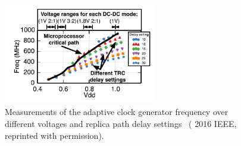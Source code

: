 \documentclass[graybox]{svmult}
\begin{document}

\begin{figure}
  \centering
  \includegraphics[width=0.6\textwidth]{6-raven3-clock}
  \caption{Measurements of the adaptive clock generator frequency over different voltages and replica path delay settings~\cite{Zimmer2016} ({\textcopyright} 2016 IEEE, reprinted with permission). }
  \label{fig:6-raven3-clock}
\end{figure}
\end{document}
